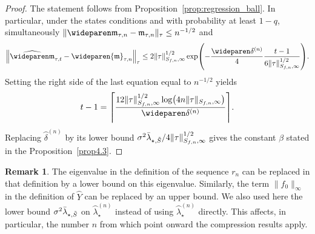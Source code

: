 \documentclass[10pt]{amsart}
\theoremstyle{definition}\newtheorem{defi}[theo]{Definition}\newtheorem{rema}[theo]{Remark}\newtheorem{exam}[theo]{Example}\newtheorem{exem}[theo]{Example}\newtheorem{nota}[theo]{Notation}
\theoremstyle{remark}
\newcommand{\mean}{\mathfrak{m}}
\newcommand{\wh}{\widehat}
\let\oldtilde\tilde
\renewcommand*{\tilde}[1]{\mathchoice{\widetilde{#1}}{\widetilde{#1}}{\oldtilde{#1}}{\oldtilde{#1}}}
\let\originalleft\left
\let\originalright\right
\renewcommand{\left}{\mathopen{}\mathclose\bgroup\originalleft}
\renewcommand{\right}{\aftergroup\egroup\originalright}
\begin{document}
\begin{proof}
The statement follows from Proposition~\ref{prop:regression_ball}. In particular, under the states conditions and with probability at least $1-q$, simultaneously $\|\wideparen \mean_{\tau,n} - \mean_{\tau,n}\|_\tau \leq n^{-1/2}$ and
\[
\left\| \wh{\wideparen \mean}_{\tau,t} - \wideparen{\mean}_{\tau,n} \right\|_\tau \leq 2 \|\tau\|_{S_{f,n},\infty}^{1/2}
\exp \left(- \frac{\wideparen \delta^{(n)}}{4} \frac{t-1}{6 \|\tau \|_{S_{f,n},\infty}^{1/2}}
\right).
\]
Setting the right side of the last equation equal to $n^{-1/2}$ yields
\[
t-1 = \left\lceil \frac{12 \|\tau \|_{S_{f,n},\infty}^{1/2} \log\left(4 n \|\tau \|_{S_{f,n},\infty}\right)}{\wideparen \delta^{(n)}}
\right\rceil.
\]
Replacing $\wideparen \delta^{(n)}$ by its lower bound $\sigma^2 \bar \lambda_{\star,\tilde S}/4 \|\tau \|_{S_{f,n},\infty}^{1/2}$ gives the constant $\beta$ stated in the Proposition~\ref{prop4.3}.
\end{proof}

\begin{rema}
The eigenvalue in the definition of the sequence $r_n$ can be replaced in that definition by a lower bound on this eigenvalue. Similarly, the term $\|f_0\|_\infty$ in the definition of $\wideparen Y$ can be replaced by an upper bound. We also used here the lower bound $\sigma^2 \bar \lambda_{\star,\tilde S}$ on $\wideparen \lambda_\star^{(n)}$ instead of using $\wideparen \lambda_\star^{(n)}$ directly. This affects, in particular, the number $n$ from which point onward the compression results apply.
\end{rema}
\end{document}
